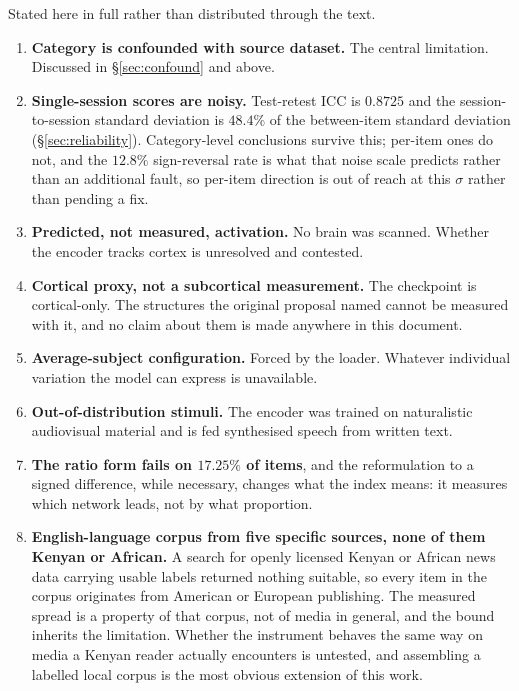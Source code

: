 Stated here in full rather than distributed through the text.

\begin{enumerate}
\item \textbf{Category is confounded with source dataset.} The central limitation. Discussed
in \S\ref{sec:confound} and above.

\item \textbf{Single-session scores are noisy.} Test-retest ICC is $0.8725$ and the
session-to-session standard deviation is $48.4\%$ of the between-item standard deviation
(\S\ref{sec:reliability}). Category-level conclusions survive this; per-item ones do not, and
the $12.8\%$ sign-reversal rate is what that noise scale predicts rather than an additional
fault, so per-item direction is out of reach at this $\sigma$ rather than pending a fix.

\item \textbf{Predicted, not measured, activation.} No brain was scanned. Whether the
encoder tracks cortex is unresolved and contested.

\item \textbf{Cortical proxy, not a subcortical measurement.} The checkpoint is
cortical-only. The structures the original proposal named cannot be measured with it, and no
claim about them is made anywhere in this document.

\item \textbf{Average-subject configuration.} Forced by the loader. Whatever individual
variation the model can express is unavailable.

\item \textbf{Out-of-distribution stimuli.} The encoder was trained on naturalistic
audiovisual material and is fed synthesised speech from written text.

\item \textbf{The ratio form fails on $17.25\%$ of items}, and the reformulation to a signed
difference, while necessary, changes what the index means: it measures which network leads,
not by what proportion.

\item \textbf{English-language corpus from five specific sources, none of them Kenyan or
African.} A search for openly licensed Kenyan or African news data carrying usable labels
returned nothing suitable, so every item in the corpus originates from American or European
publishing. The measured spread is a property of that corpus, not of media in general, and
the bound inherits the limitation. Whether the instrument behaves the same way on media a
Kenyan reader actually encounters is untested, and assembling a labelled local corpus is the
most obvious extension of this work.


\end{enumerate}
